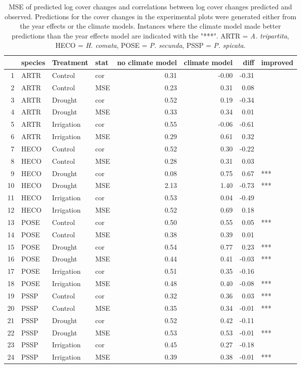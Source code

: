 \begin{table}[H]
\centering
\caption{MSE of predicted log cover changes and correlations between log cover changes predicted and observed. Predictions for the cover changes in the experimental plots were generated either from the year effects or the climate models. Instances where the climate model made better predictions than the year effects model are indicated with the "***". ARTR = \textit{A. tripartita}, HECO = \textit{H. comata}, POSE = \textit{P. secunda}, PSSP = \textit{P. spicata}.} 
\label{table:corPGR}
\begin{tabular}{rlllrrrl}
  \hline
 & species & Treatment & stat & no climate model & climate model & diff & improved \\ 
  \hline
1 & ARTR & Control & cor & 0.31 & -0.00 & -0.31 &  \\ 
  2 & ARTR & Control & MSE & 0.23 & 0.31 & 0.08 &  \\ 
  3 & ARTR & Drought & cor & 0.52 & 0.19 & -0.34 &  \\ 
  4 & ARTR & Drought & MSE & 0.33 & 0.34 & 0.01 &  \\ 
  5 & ARTR & Irrigation & cor & 0.55 & -0.06 & -0.61 &  \\ 
  6 & ARTR & Irrigation & MSE & 0.29 & 0.61 & 0.32 &  \\ 
  7 & HECO & Control & cor & 0.52 & 0.30 & -0.22 &  \\ 
  8 & HECO & Control & MSE & 0.28 & 0.31 & 0.03 &  \\ 
  9 & HECO & Drought & cor & 0.08 & 0.75 & 0.67 & *** \\ 
  10 & HECO & Drought & MSE & 2.13 & 1.40 & -0.73 & *** \\ 
  11 & HECO & Irrigation & cor & 0.53 & 0.04 & -0.49 &  \\ 
  12 & HECO & Irrigation & MSE & 0.52 & 0.69 & 0.18 &  \\ 
  13 & POSE & Control & cor & 0.50 & 0.55 & 0.05 & *** \\ 
  14 & POSE & Control & MSE & 0.38 & 0.39 & 0.01 &  \\ 
  15 & POSE & Drought & cor & 0.54 & 0.77 & 0.23 & *** \\ 
  16 & POSE & Drought & MSE & 0.44 & 0.41 & -0.03 & *** \\ 
  17 & POSE & Irrigation & cor & 0.51 & 0.35 & -0.16 &  \\ 
  18 & POSE & Irrigation & MSE & 0.48 & 0.40 & -0.08 & *** \\ 
  19 & PSSP & Control & cor & 0.32 & 0.36 & 0.03 & *** \\ 
  20 & PSSP & Control & MSE & 0.35 & 0.34 & -0.01 & *** \\ 
  21 & PSSP & Drought & cor & 0.52 & 0.42 & -0.11 &  \\ 
  22 & PSSP & Drought & MSE & 0.53 & 0.53 & -0.01 & *** \\ 
  23 & PSSP & Irrigation & cor & 0.45 & 0.27 & -0.18 &  \\ 
  24 & PSSP & Irrigation & MSE & 0.39 & 0.38 & -0.01 & *** \\ 
   \hline
\end{tabular}
\end{table}
